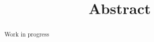 \documentclass[../DD.tex]{subfiles}
\begin{document}
\title{Abstract}
\begin{abstract}
	Work in progress
\end{abstract}

\thispagestyle{fancy}
	\newpage
		
\end{document}
